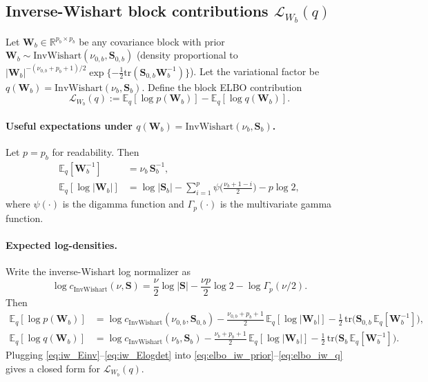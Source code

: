 \documentclass[11pt]{article}
\newcommand{\R}{\mathbb{R}}
\newcommand{\1}{\mathbb{I}}
\newcommand{\IW}{\mathrm{InvWishart}}
\newcommand{\tr}{\mathrm{tr}}
\newcommand{\E}{\mathbb{E}}
\begin{document}
\subsection{Inverse-Wishart block contributions \texorpdfstring{$\mathcal{L}_{W_b}(q)$}{LWb(q)}}

Let $\bm W_b\in\R^{p_b\times p_b}$ be any covariance block with prior $\bm W_b\sim\IW(\nu_{0,b},\bm S_{0,b})$
(density proportional to $|\bm W_b|^{-(\nu_{0,b}+p_b+1)/2}\exp\{-\tfrac12\tr(\bm S_{0,b}\bm W_b^{-1})\}$).
Let the variational factor be $q(\bm W_b)=\IW(\nu_{b},\bm S_{b})$.
Define the block ELBO contribution
\begin{equation}
\mathcal{L}_{W_b}(q)
:=
\E_q[\log p(\bm W_b)] - \E_q[\log q(\bm W_b)].
\label{eq:LW_def}
\end{equation}

\paragraph{Useful expectations under $q(\bm W_b)=\IW(\nu_b,\bm S_b)$.}
Let $p=p_b$ for readability. Then
\begin{align}
\E_q[\bm W_b^{-1}] &= \nu_b\,\bm S_b^{-1}, \label{eq:iw_Einv}\\
\E_q[\log|\bm W_b|] &= \log|\bm S_b| - \sum_{i=1}^{p}\psi\!\Big(\frac{\nu_b+1-i}{2}\Big) - p\log 2,
\label{eq:iw_Elogdet}
\end{align}
where $\psi(\cdot)$ is the digamma function and $\Gamma_p(\cdot)$ is the multivariate gamma function.

\paragraph{Expected log-densities.}
Write the inverse-Wishart log normalizer as
\[
\log c_{\IW}(\nu,\bm S)
=
\frac{\nu}{2}\log|\bm S| - \frac{\nu p}{2}\log 2 - \log\Gamma_p(\nu/2).
\]
Then
\begin{align}
\E_q[\log p(\bm W_b)]
&=
\log c_{\IW}(\nu_{0,b},\bm S_{0,b})
-\frac{\nu_{0,b}+p_b+1}{2}\,\E_q[\log|\bm W_b|]
-\frac12\,\tr\!\big(\bm S_{0,b}\,\E_q[\bm W_b^{-1}]\big), \label{eq:elbo_iw_prior}\\
\E_q[\log q(\bm W_b)]
&=
\log c_{\IW}(\nu_{b},\bm S_{b})
-\frac{\nu_{b}+p_b+1}{2}\,\E_q[\log|\bm W_b|]
-\frac12\,\tr\!\big(\bm S_{b}\,\E_q[\bm W_b^{-1}]\big). \label{eq:elbo_iw_q}
\end{align}
Plugging \eqref{eq:iw_Einv}--\eqref{eq:iw_Elogdet} into \eqref{eq:elbo_iw_prior}--\eqref{eq:elbo_iw_q}
gives a closed form for $\mathcal{L}_{W_b}(q)$.
\end{document}
